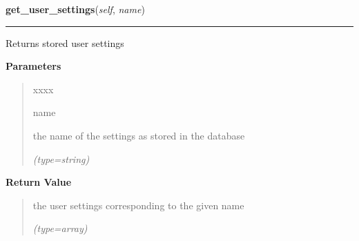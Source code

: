 \hspace{.8\funcindent}\begin{boxedminipage}{\funcwidth}

    \raggedright \textbf{get\_user\_settings}(\textit{self}, \textit{name})

    \vspace{-1.5ex}

    \rule{\textwidth}{0.5\fboxrule}
\setlength{\parskip}{2ex}
    Returns stored user settings

\setlength{\parskip}{1ex}
      \textbf{Parameters}
      \vspace{-1ex}

      \begin{quote}
        \begin{Ventry}{xxxx}

          \item[name]

          the name of the settings as stored in the database

            {\it (type=string)}

        \end{Ventry}

      \end{quote}

      \textbf{Return Value}
    \vspace{-1ex}

      \begin{quote}
      the user settings corresponding to the given name

      {\it (type=array)}

      \end{quote}

    \end{boxedminipage}

    \label{DBE:DBE:create_group}

    \vspace{0.5ex}

